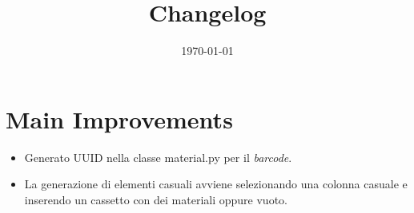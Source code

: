 \documentclass[a4paper]{article}
\begin{document}
	\title{Changelog}
	\date{\today}
	\maketitle
	
	\newpage
	
	\section*{Main Improvements}
	
	\begin{itemize}[label=]
		\item Generato \textsf{UUID} nella classe \textsf{material.py} per il \emph{barcode}.
		
		\item La generazione di elementi casuali avviene selezionando una colonna casuale e inserendo un cassetto con dei materiali oppure vuoto.
	\end{itemize}
\end{document}

